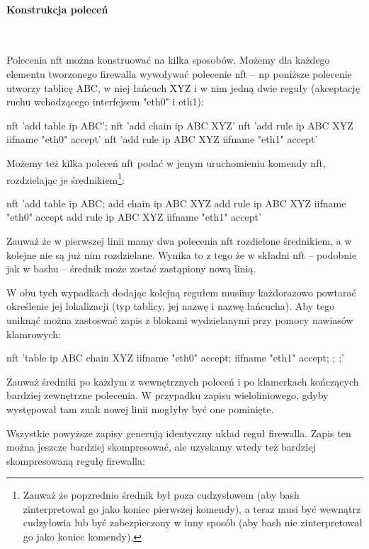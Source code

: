 \paragraph{Konstrukcja poleceń}
\ 

Polecenia nft można konstruować na kilka sposobów.
%
Możemy dla każdego elementu tworzonego firewalla wywoływać polecenie nft – np poniższe polecenie utworzy tablicę ABC, w niej łańcuch XYZ i w nim jedną dwie reguły (akceptację ruchu wchodzącego interfejsem "eth0" i eth1):

\begin{CodeFrame*}[bash]{}
nft 'add table ip ABC';  nft 'add chain ip ABC XYZ'
nft 'add rule  ip ABC XYZ iifname "eth0" accept'
nft 'add rule  ip ABC XYZ iifname "eth1" accept'
\end{CodeFrame*}

Możemy też kilka poleceń nft podać w jenym uruchomieniu komendy nft, rozdzielając je średnikiem\footnote{
	Zauważ że popzrednio średnik był poza cudzysłowem (aby bash zinterpretował go jako koniec pierwszej komendy),
	a teraz musi być wewnątrz cudzyłowia lub być zabezpieczony w inny sposób (aby bash nie zinterpretował go jako koniec komendy).
}:

\begin{CodeFrame*}[bash]{}
nft 'add table ip ABC; add chain ip ABC XYZ
     add rule ip ABC XYZ iifname "eth0" accept
     add rule ip ABC XYZ iifname "eth1" accept'
\end{CodeFrame*}

Zauważ że w pierwszej linii mamy dwa polecenia nft rozdielone średnikiem, a w kolejne nie są już nim rozdzielane.
Wynika to z tego że w składni nft – podobnie jak w bashu – średnik może zostać zastąpiony nową linią.

W obu tych wypadkach dodając kolejną regułem musimy każdorazowo powtarać określenie jej lokalizacji (typ tablicy, jej nazwę i nazwę łańcucha).
Aby tego uniknąć można zastoswać zapis z blokami wydzielanymi przy pomocy nawiasów klamrowych:

\begin{CodeFrame*}[bash]{}
nft 'table ip ABC { chain XYZ { iifname "eth0" accept; iifname "eth1" accept; }; };'
\end{CodeFrame*}

Zauważ średniki po każdym z wewnętrznych poleceń i po klamerkach kończących bardziej zewnętrzne polecenia.
W przypadku zapisu wieloliniowego, gdyby występował tam znak nowej linii mogłyby być one pominięte.

Wszystkie powyższe zapisy generują identyczny układ reguł firewalla.
Zapis ten można jeszcze bardziej skompresować, ale uzyskamy wtedy też bardziej skompresowaną regułę firewalla:

